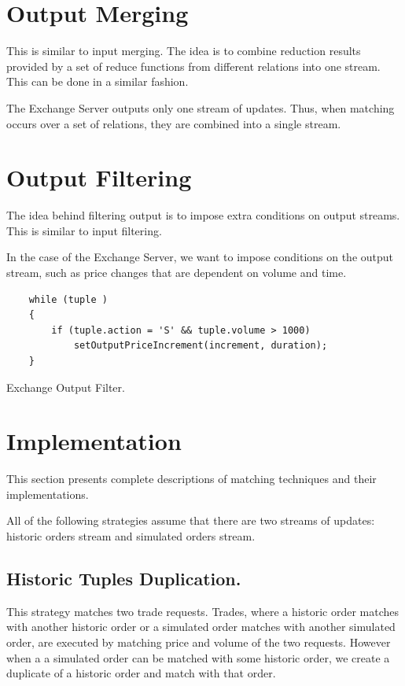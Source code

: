 \documentclass{article}
\begin{document}
\section{Output Merging}

This is similar to input merging. The idea is to combine reduction results provided by a set of reduce functions from different relations into one stream. This can be done in a similar fashion. 

The Exchange Server outputs only one stream of updates. Thus, when matching occurs over a set of relations, they are combined into a single stream. 


\section{Output Filtering} 

The idea behind filtering output is to impose extra conditions on output streams. This is similar to input filtering. 

In the case of the Exchange Server, we want to impose conditions on the output stream, such as price changes that are dependent on volume and time. 
\begin{program}
    \begin{verbatim}  
    while (tuple )
    {
        if (tuple.action = 'S' && tuple.volume > 1000)
            setOutputPriceIncrement(increment, duration);
    }
    \end{verbatim}
\caption{Exchange Output Filter.}
\end{program}

\section{Implementation}

This section presents complete descriptions of matching techniques and their implementations. 

All of the following strategies assume that there are two streams of updates: historic orders stream and simulated orders stream.

\subsection{Historic Tuples Duplication.}

This strategy matches two trade requests. Trades, where a historic order matches with another historic order or a simulated order matches with another simulated order, are executed by matching price and volume of the two requests. However when a a simulated order can be matched with some historic order, we create a duplicate of a historic order and match with that order.
\end{document}
